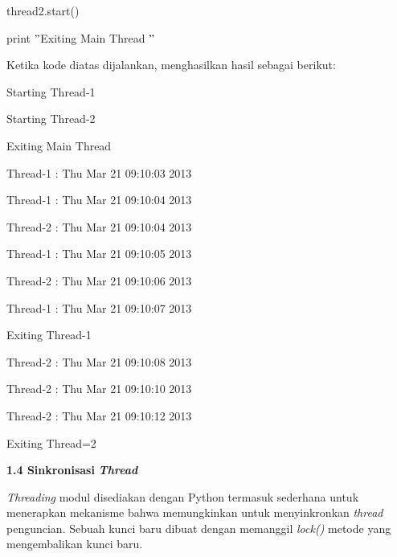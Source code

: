 \documentclass[a4paper,12pt]{report}
\begin{document}
\noindent 
{\fontsize{9pt}{9pt}\selectfont thread2.start()} \par
\noindent 
{\fontsize{9pt}{9pt}\selectfont print  $ " $Exiting Main Thread $ " $} \par
\vspace{12pt}
\begin{adjustwidth}{-0.59in}{-0.5in}
Ketika kode diatas dijalankan, menghasilkan hasil sebagai berikut:\end{adjustwidth}
 \par
\noindent 
{\fontsize{10pt}{10pt}\selectfont Starting Thread-1} \par
\noindent 
{\fontsize{10pt}{10pt}\selectfont Starting Thread-2} \par
\noindent 
{\fontsize{10pt}{10pt}\selectfont Exiting Main Thread} \par
\noindent 
{\fontsize{10pt}{10pt}\selectfont Thread-1 : Thu Mar 21 09:10:03 2013} \par
\noindent 
{\fontsize{10pt}{10pt}\selectfont Thread-1 : Thu Mar 21 09:10:04 2013} \par
\noindent 
{\fontsize{10pt}{10pt}\selectfont Thread-2 : Thu Mar 21 09:10:04 2013} \par
\noindent 
{\fontsize{10pt}{10pt}\selectfont Thread-1 : Thu Mar 21 09:10:05 2013} \par
\noindent 
{\fontsize{10pt}{10pt}\selectfont Thread-2 : Thu Mar 21 09:10:06 2013} \par
\noindent 
{\fontsize{10pt}{10pt}\selectfont Thread-1 : Thu Mar 21 09:10:07 2013} \par
\noindent 
{\fontsize{10pt}{10pt}\selectfont Exiting Thread-1} \par
\noindent 
{\fontsize{10pt}{10pt}\selectfont Thread-2 : Thu Mar 21 09:10:08 2013} \par
\noindent 
{\fontsize{10pt}{10pt}\selectfont Thread-2 : Thu Mar 21 09:10:10 2013} \par
\noindent 
{\fontsize{10pt}{10pt}\selectfont Thread-2 : Thu Mar 21 09:10:12 2013} \par
\noindent 
{\fontsize{10pt}{10pt}\selectfont Exiting Thread=2} \par
\vspace{12pt}
\vspace{12pt}
\vspace{12pt}
\vspace{12pt}
\textbf{ 1.4 Sinkronisasi }\textbf{\textit{Thread}} \par
\textit{T}\textit{hread}\textit{ing }modul disediakan dengan Python termasuk sederhana untuk menerapkan mekanisme bahwa memungkinkan untuk menyinkronkan \textit{thread}\textit{ }penguncian. Sebuah kunci baru dibuat dengan memanggil \textit{lock() }metode yang mengembalikan kunci baru. \par
\end{document}
